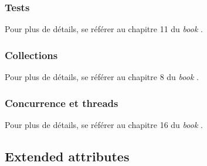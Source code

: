 \documentclass[a4paper, 12pt]{article}
\begin{document}
\subsubsection{Tests}

Pour plus de détails, se référer au chapitre 11 du \textit{book} \cite{ref0}.

\subsubsection{Collections}\label{rust_collections}

Pour plus de détails, se référer au chapitre 8 du \textit{book} \cite{ref0}.

\subsubsection{Concurrence et threads}

Pour plus de détails, se référer au chapitre 16 du \textit{book} \cite{ref0}.


\subsection{Extended attributes}\label{extended_attributes}
\end{document}
